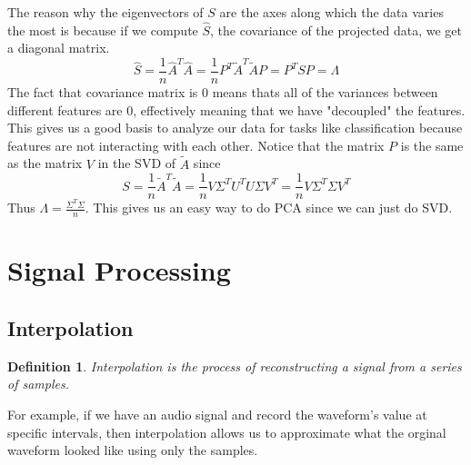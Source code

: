 \documentclass{article}
\newtheorem{definition}{Definition}
\begin{document}
The reason why the eigenvectors of $S$ are the axes along which the data varies the most is because 
if we compute $\hat{S}$, the covariance of the projected data, we get a diagonal matrix.
$$\hat{S}=\frac{1}{n}\hat{A}^T\hat{A} = \frac{1}{n}P^T\tilde{A}^T\tilde{A}P=P^TSP=\Lambda$$
The fact that covariance matrix is 0 means thats all of the variances between different features are 0,
effectively meaning that we have "decoupled" the features.
This gives us a good basis to analyze our data for tasks like classification because features are not interacting with each other.
Notice that the matrix $P$ is the same as the matrix $V$ in the SVD of $\tilde{A}$ since 
$$S=\frac{1}{n}\tilde{A}^T\tilde{A} = \frac{1}{n}V\Sigma^TU^TU\Sigma V^T = \frac{1}{n}V\Sigma^T\Sigma V^T$$
Thus $\Lambda = \frac{\Sigma^T \Sigma}{n}$. This gives us an easy way to do PCA since we can just do SVD.
\section{Signal Processing}
\subsection{Interpolation}
\begin{definition}
    Interpolation is the process of reconstructing a signal from a series of samples.
\end{definition}
For example, if we have an audio signal and record the waveform's value at specific intervals,
then interpolation allows us to approximate what the orginal waveform looked like using only the samples.
\end{document}
